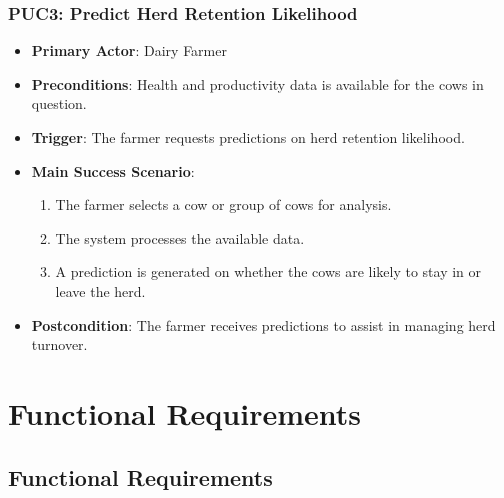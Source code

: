 \documentclass[12pt]{article}
\begin{document}
\subsubsection{PUC3: Predict Herd Retention Likelihood}
\begin{itemize}
    \item \textbf{Primary Actor}: Dairy Farmer
    \item \textbf{Preconditions}: Health and productivity data is available 
    for the cows in question.
    \item \textbf{Trigger}: The farmer requests predictions on herd retention 
    likelihood.
    \item \textbf{Main Success Scenario}:
    \begin{enumerate}
        \item The farmer selects a cow or group of cows for analysis.
        \item The system processes the available data.
        \item A prediction is generated on whether the cows are likely to stay 
        in or leave the herd.
    \end{enumerate}
    \item \textbf{Postcondition}: The farmer receives predictions to assist in 
    managing herd turnover.
\end{itemize}


\section{Functional Requirements}

\subsection{Functional Requirements}
\end{document}
